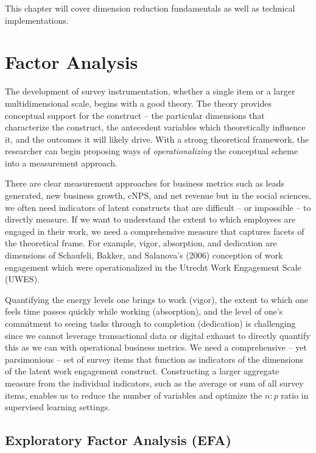 \documentclass[
]{book}
\begin{document}
This chapter will cover dimension reduction fundamentals as well as technical implementations.

\hypertarget{factor-analysis}{%
\section{Factor Analysis}\label{factor-analysis}}

The development of survey instrumentation, whether a single item or a larger multidimensional scale, begins with a good theory. The theory provides conceptual support for the construct -- the particular dimensions that characterize the construct, the antecedent variables which theoretically influence it, and the outcomes it will likely drive. With a strong theoretical framework, the researcher can begin proposing ways of \emph{operationalizing} the conceptual scheme into a measurement approach.

There are clear measurement approaches for business metrics such as leads generated, new business growth, cNPS, and net revenue but in the social sciences, we often need indicators of latent constructs that are difficult -- or impossible -- to directly measure. If we want to understand the extent to which employees are engaged in their work, we need a comprehensive measure that captures facets of the theoretical frame. For example, vigor, absorption, and dedication are dimensions of Schaufeli, Bakker, and Salanova's (2006) conception of work engagement which were operationalized in the Utrecht Work Engagement Scale (UWES).

Quantifying the energy levels one brings to work (vigor), the extent to which one feels time passes quickly while working (absorption), and the level of one's commitment to seeing tasks through to completion (dedication) is challenging since we cannot leverage transactional data or digital exhaust to directly quantify this as we can with operational business metrics. We need a comprehensive -- yet parsimonious -- set of survey items that function as indicators of the dimensions of the latent work engagement construct. Constructing a larger aggregate measure from the individual indicators, such as the average or sum of all survey items, enables us to reduce the number of variables and optimize the \(n:p\) ratio in supervised learning settings.

\hypertarget{exploratory-factor-analysis-efa}{%
\subsection{Exploratory Factor Analysis (EFA)}\label{exploratory-factor-analysis-efa}}
\end{document}
